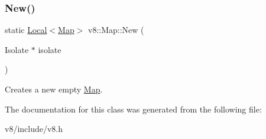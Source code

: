 \subsubsection{\texorpdfstring{New()}{New()}}
{\footnotesize\ttfamily static \mbox{\hyperlink{classv8_1_1Local}{Local}}$<$\mbox{\hyperlink{classv8_1_1Map}{Map}}$>$ v8\+::\+Map\+::\+New (\begin{DoxyParamCaption}\item[{Isolate $\ast$}]{isolate }\end{DoxyParamCaption})\hspace{0.3cm}{\ttfamily [static]}}

Creates a new empty \mbox{\hyperlink{classv8_1_1Map}{Map}}. 

The documentation for this class was generated from the following file\+:\begin{DoxyCompactItemize}
\item 
v8/include/v8.\+h\end{DoxyCompactItemize}
